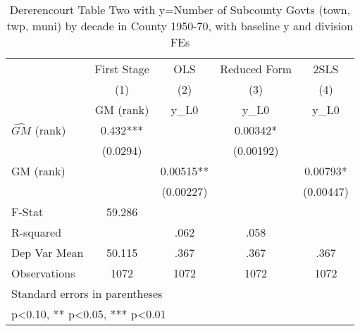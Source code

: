 \begin{table}[htbp]\centering
\def\sym#1{\ifmmode^{#1}\else\(^{#1}\)\fi}
\caption{Dererencourt Table Two with y=Number of Subcounty Govts (town, twp, muni) by decade in County 1950-70, with baseline y and division FEs}
\begin{tabular}{l*{4}{c}}
\toprule
                    & First Stage   &         OLS   &Reduced Form   &        2SLS   \\
                    &\multicolumn{1}{c}{(1)}&\multicolumn{1}{c}{(2)}&\multicolumn{1}{c}{(3)}&\multicolumn{1}{c}{(4)}\\
                    &\multicolumn{1}{c}{GM  (rank)}&\multicolumn{1}{c}{y\_L0}&\multicolumn{1}{c}{y\_L0}&\multicolumn{1}{c}{y\_L0}\\
\midrule
$\hat{GM}$ (rank)   &       0.432***&               &     0.00342*  &               \\
                    &    (0.0294)   &               &   (0.00192)   &               \\
\addlinespace
GM  (rank)          &               &     0.00515** &               &     0.00793*  \\
                    &               &   (0.00227)   &               &   (0.00447)   \\
\midrule
F-Stat              &      59.286   &               &               &               \\
R-squared           &               &        .062   &        .058   &               \\
Dep Var Mean        &      50.115   &        .367   &        .367   &        .367   \\
Observations        &        1072   &        1072   &        1072   &        1072   \\
\bottomrule
\multicolumn{5}{l}{\footnotesize Standard errors in parentheses}\\
\multicolumn{5}{l}{\footnotesize * p<0.10, ** p<0.05, *** p<0.01}\\
\end{tabular}
\end{table}
